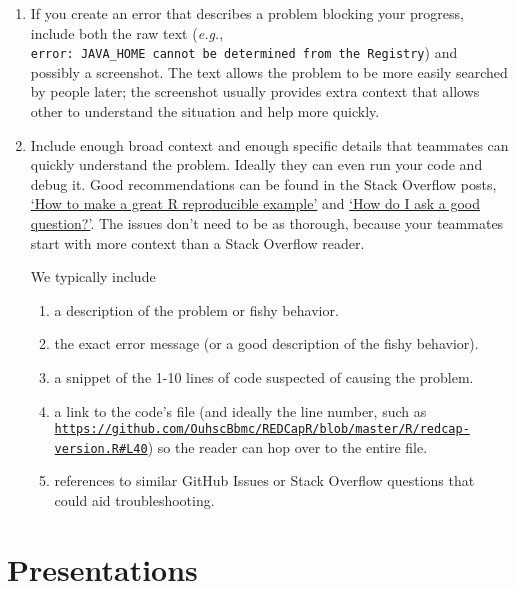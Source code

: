 \documentclass[]{book}
\begin{document}
\begin{enumerate}
\def\labelenumi{\arabic{enumi}.}
\item
  If you create an error that describes a problem blocking your progress, include both the raw text (\emph{e.g.}, \texttt{error:\ JAVA\_HOME\ cannot\ be\ determined\ from\ the\ Registry}) and possibly a screenshot. The text allows the problem to be more easily searched by people later; the screenshot usually provides extra context that allows other to understand the situation and help more quickly.
\item
  Include enough broad context and enough specific details that teammates can quickly understand the problem. Ideally they can even run your code and debug it. Good recommendations can be found in the Stack Overflow posts, \href{https://stackoverflow.com/questions/5963269/how-to-make-a-great-r-reproducible-example?rq=1}{`How to make a great R reproducible example'} and \href{https://stackoverflow.com/help/how-to-ask}{`How do I ask a good question?'}. The issues don't need to be as thorough, because your teammates start with more context than a Stack Overflow reader.

  We typically include

  \begin{enumerate}
  \def\labelenumii{\arabic{enumii}.}
  \item
    a description of the problem or fishy behavior.
  \item
    the exact error message (or a good description of the fishy behavior).
  \item
    a snippet of the 1-10 lines of code suspected of causing the problem.
  \item
    a link to the code's file (and ideally the line number, such as \href{https://github.com/OuhscBbmc/REDCapR/blob/master/R/redcap-version.R\#L40}{\texttt{https://github.com/OuhscBbmc/REDCapR/blob/master/R/redcap-version.R\#L40}}) so the reader can hop over to the entire file.
  \item
    references to similar GitHub Issues or Stack Overflow questions that could aid troubleshooting.
  \end{enumerate}
\end{enumerate}

\hypertarget{presentations}{%
\chapter{Presentations}\label{presentations}}
\end{document}
